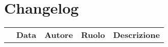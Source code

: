 \thispagestyle{empty}
\section*{Changelog}
\begin{table}[H]
\centering
\renewcommand{\arraystretch}{1.8}
	\begin{longtable}[c]{c | c | c | c | p{5cm}}
		\rowcolor[HTML]{a52a2a}
        \multicolumn{1}{c}{\color[HTML]{FFFFFF} \textbf{Versione}} &
        \multicolumn{1}{c}{\color[HTML]{FFFFFF} \textbf{Data}} &
        \multicolumn{1}{c}{\color[HTML]{FFFFFF} \textbf{Autore}} &
        \multicolumn{1}{c}{\color[HTML]{FFFFFF} \textbf{Ruolo}}     &
        \multicolumn{1}{c}{\color[HTML]{FFFFFF} \textbf{Descrizione}}                                                                                                                                                                   
        \\
	\end{longtable}
	
\end{table}